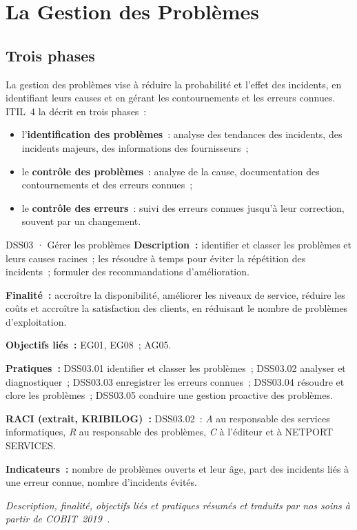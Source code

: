 \section{La Gestion des Problèmes}
\label{sec:c13-problemes}

\subsection{Trois phases}

La gestion des problèmes vise à réduire la probabilité et l'effet des
incidents, en identifiant leurs causes et en gérant les contournements et
les erreurs connues. ITIL~4 la décrit en trois phases~:
\begin{itemize}
    \item l'\textbf{identification des problèmes}~: analyse des tendances
          des incidents, des incidents majeurs, des informations des
          fournisseurs~;
    \item le \textbf{contrôle des problèmes}~: analyse de la cause,
          documentation des contournements et des erreurs connues~;
    \item le \textbf{contrôle des erreurs}~: suivi des erreurs connues
          jusqu'à leur correction, souvent par un changement.
\end{itemize}

\begin{boxobjet}{DSS03 · Gérer les problèmes}
\textbf{Description~:} identifier et classer les problèmes et leurs causes
racines~; les résoudre à temps pour éviter la répétition des incidents~;
formuler des recommandations d'amélioration.

\textbf{Finalité~:} accroître la disponibilité, améliorer les niveaux de
service, réduire les coûts et accroître la satisfaction des clients, en
réduisant le nombre de problèmes d'exploitation.

\textbf{Objectifs liés~:} EG01, EG08~; AG05.

\textbf{Pratiques~:} DSS03.01 identifier et classer les problèmes~;
DSS03.02 analyser et diagnostiquer~; DSS03.03 enregistrer les erreurs
connues~; DSS03.04 résoudre et clore les problèmes~; DSS03.05 conduire une
gestion proactive des problèmes.

\textbf{RACI (extrait, KRIBILOG)~:} DSS03.02~: \emph{A} au responsable des
services informatiques, \emph{R} au responsable des problèmes, \emph{C} à
l'éditeur et à NETPORT SERVICES.

\textbf{Indicateurs~:} nombre de problèmes ouverts et leur âge, part des
incidents liés à une erreur connue, nombre d'incidents évités.
\end{boxobjet}
{\small\itshape Description, finalité, objectifs liés et pratiques résumés
et traduits par nos soins à partir de COBIT~2019~\cite{isaca2018cobitobjectifs}.}

